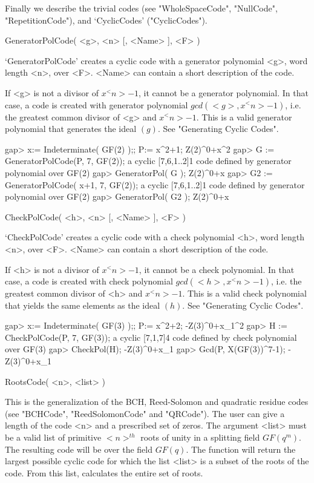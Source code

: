 Finally we describe the trivial codes (see "WholeSpaceCode",  "NullCode",
"RepetitionCode"), and `CyclicCodes' ("CyclicCodes").

\>GeneratorPolCode( <g>, <n> [, <Name> ], <F> )

`GeneratorPolCode' creates a cyclic code with a generator polynomial <g>,
word length <n>,  over <F>.  <Name> can contain  a short
description of the code.

If  <g>   is not   a divisor   of $x^<n>-1$,   it cannot  be  a generator
polynomial. In  that case,  a code  is created  with generator polynomial
$gcd( <g>,  x^<n>-1  )$, i.e.   the  greatest common divisor  of  <g> and
$x^<n>-1$. This is a valid  generator polynomial that generates the ideal
$(g)$. See "Generating Cyclic Codes".

\beginexample
gap> x:= Indeterminate( GF(2) );; P:= x^2+1;
Z(2)^0+x^2
gap> G := GeneratorPolCode(P, 7, GF(2));
a cyclic [7,6,1..2]1 code defined by generator polynomial over GF(2)
gap> GeneratorPol( G );
Z(2)^0+x
gap> G2 := GeneratorPolCode( x+1, 7, GF(2)); 
a cyclic [7,6,1..2]1 code defined by generator polynomial over GF(2)
gap> GeneratorPol( G2 );
Z(2)^0+x
\endexample

\>CheckPolCode( <h>, <n> [, <Name> ], <F> )

`CheckPolCode' creates  a cyclic code  with a  check polynomial <h>, word
length <n>, over <F>. <Name> can contain  a short
description of the code.

If <h> is not a divisor of $x^<n>-1$, it cannot be a check polynomial. In
that case, a code is created with check polynomial $gcd( <h>, x^<n>-1 )$,
i.e. the greatest common divisor  of <h> and  $x^<n>-1$. This is a  valid
check polynomial that yields the same  elements as the ideal $(h)$. See
"Generating Cyclic Codes".

\beginexample
gap>  x:= Indeterminate( GF(3) );; P:= x^2+2;
-Z(3)^0+x_1^2
gap> H := CheckPolCode(P, 7, GF(3));
a cyclic [7,1,7]4 code defined by check polynomial over GF(3)
gap> CheckPol(H);
-Z(3)^0+x_1
gap> Gcd(P, X(GF(3))^7-1);
-Z(3)^0+x_1
\endexample

\>RootsCode( <n>, <list> )

This is the generalization of the BCH, Reed-Solomon and quadratic residue
codes (see "BCHCode", "ReedSolomonCode" and  "QRCode"). The user can give
a length of  the code <n>  and a  prescribed  set of zeros. The  argument
<list> must be a valid  list of primitive $<n>^{th}$  roots of unity in a
splitting field $GF(q^m)$.  The resulting  code  will be over  the  field
$GF(q)$. The function  will return the  largest possible cyclic  code for
which  the list <list> is  a subset of the  roots  of the code. From this
list, {\GUAVA} calculates the entire set of roots.

